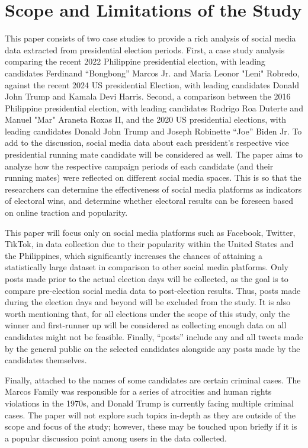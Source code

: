 \section{Scope and Limitations of the Study}
This paper consists of two case studies to provide a rich analysis of social media data extracted from presidential election periods. First, a case study analysis comparing the recent 2022 Philippine presidential election, with leading candidates Ferdinand “Bongbong” Marcos Jr. and Maria Leonor "Leni" Robredo, against the recent 2024 US presidential Election, with leading candidates Donald John Trump and Kamala Devi Harris. Second, a comparison between the 2016 Philippine presidential election, with leading candidates Rodrigo Roa Duterte and Manuel "Mar" Araneta Roxas II, and the 2020 US presidential elections, with leading candidates Donald John Trump and Joseph Robinette “Joe” Biden Jr. To add to the discussion, social media data about each president’s respective vice presidential running mate candidate will be considered as well. The paper aims to analyze how the respective campaign periods of each candidate (and their running mates) were reflected on different social media spaces. This is so that the researchers can determine the effectiveness of social media platforms as indicators of electoral wins, and determine whether electoral results can be foreseen based on online traction and popularity.

This paper will focus only on social media platforms such as Facebook, Twitter, TikTok, in data collection due to their popularity within the United States and the Philippines, which significantly increases the chances of attaining a statistically large dataset in comparison to other social media platforms. Only posts made prior to the actual election days will be collected, as the goal is to compare pre-election social media data to post-election results. Thus, posts made during the election days and beyond will be excluded from the study. It is also worth mentioning that, for all elections under the scope of this study, only the winner and first-runner up will be considered as collecting enough data on all candidates might not be feasible.\cite{RRL_Macrohon-2022} Finally, “posts” include any and all tweets made by the general public on the selected candidates alongside any posts made by the candidates themselves.

Finally, attached to the names of some candidates are certain criminal cases. The Marcos Family was responsible for a series of atrocities and human rights violations in the 1970s, and Donald Trump is currently facing multiple criminal cases.\cite{SaL_AlJazeera-2024,SaL_AmnInt-2022} The paper will not explore such topics in-depth as they are outside of the scope and focus of the study; however, these may be touched upon briefly if it is a popular discussion point among users in the data collected.